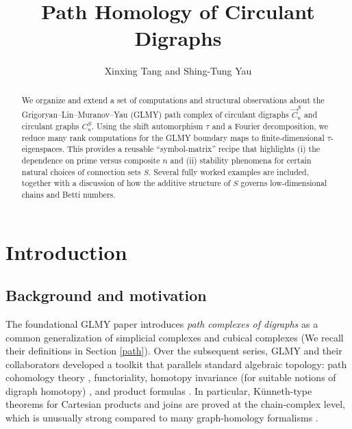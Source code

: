 \documentclass[11pt]{amsart}
\theoremstyle{plain}
\theoremstyle{definition}
\numberwithin{equation}{section}
\begin{document}
\title{Path Homology of Circulant Digraphs}
\author{Xinxing Tang and Shing-Tung Yau}


  \address{
X. Tang: Beijing Institute of Mathematical Sciences and Applications, Beijing, China;
}
  \address{
S.-T. Yau: Yau Mathematical Sciences Center, Tsinghua University, and Beijing Institute of Mathematical Sciences and Applications, Beijing, China;
}



\maketitle

\begin{abstract} We organize and extend a set of computations and structural observations about the
Grigoryan--Lin--Muranov--Yau (GLMY) path complex of circulant digraphs $\vec{C}_n^S$ and circulant graphs $C_n^S$. Using the shift automorphism $\tau$ and a Fourier decomposition, we reduce many rank computations for the GLMY boundary maps to finite-dimensional $\tau$-eigenspaces. This provides a reusable “symbol-matrix” recipe that highlights (i) the dependence on prime versus composite $n$ and (ii) stability phenomena for certain natural choices
of connection sets $S$. Several fully worked examples are included, together with a discussion of how
the additive structure of $S$ governs low-dimensional chains and Betti numbers.
\end{abstract}

\tableofcontents

\section{Introduction}

\subsection{Background and motivation}
The foundational GLMY paper \cite{GLMY:basic} introduces \emph{path complexes of digraphs} as a common generalization of simplicial complexes and cubical complexes (We recall their definitions in Section \ref{path}). Over the subsequent series, GLMY and their collaborators developed a toolkit that parallels standard algebraic topology: path cohomology theory \cite{GLMY:cohomology}, functoriality, homotopy invariance (for suitable notions of digraph homotopy) \cite{GLMY:homotopy}, and product formulas \cite{GMY:product}. In particular, K\"unneth-type theorems for Cartesian products and joins are proved at the chain-complex level, which is unusually strong compared to many graph-homology formalisms . 
\end{document}
